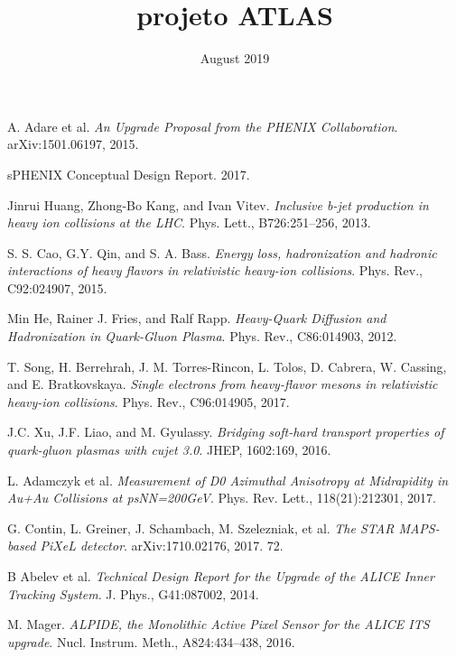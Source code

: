 \documentclass{report}
\title{projeto ATLAS}
\date{August 2019}
\begin{document}

%



\tableofcontents








%


\begin{thebibliography}{9}

A. Adare et al. \textit{An Upgrade Proposal from the PHENIX Collaboration}. arXiv:1501.06197, 2015.

 sPHENIX Conceptual Design Report. 2017.

 Jinrui Huang, Zhong-Bo Kang, and Ivan Vitev. \textit{Inclusive b-jet production in heavy ion collisions at the LHC}. Phys. Lett., B726:251–256, 2013.

 S. S. Cao, G.Y. Qin, and S. A. Bass. \textit{Energy loss, hadronization and hadronic interactions of heavy flavors in relativistic heavy-ion collisions}. Phys. Rev., C92:024907, 2015.

 Min He, Rainer J. Fries, and Ralf Rapp. \textit{Heavy-Quark Diffusion and Hadronization in Quark-Gluon Plasma}. Phys. Rev., C86:014903, 2012.

 T. Song, H. Berrehrah, J. M. Torres-Rincon, L. Tolos, D. Cabrera, W. Cassing, and E. Bratkovskaya. \textit{Single electrons from heavy-flavor mesons in relativistic heavy-ion collisions}. Phys. Rev., C96:014905, 2017.

 J.C. Xu, J.F. Liao, and M. Gyulassy. \textit{Bridging soft-hard transport properties of quark-gluon plasmas with cujet 3.0}. JHEP, 1602:169, 2016.

  L. Adamczyk et al. \textit{Measurement of D0 Azimuthal Anisotropy at Midrapidity in Au+Au Collisions at psNN=200GeV}. Phys. Rev. Lett., 118(21):212301, 2017.

 G. Contin, L. Greiner, J. Schambach, M. Szelezniak, et al. \textit{The STAR MAPS-based PiXeL detector}. arXiv:1710.02176, 2017. 72.

 B Abelev et al. \textit{Technical Design Report for the Upgrade of the ALICE Inner Tracking System}. J. Phys., G41:087002, 2014.

 M. Mager. \textit{ALPIDE, the Monolithic Active Pixel Sensor for the ALICE ITS upgrade}. Nucl. Instrum. Meth., A824:434–438, 2016.


\end{thebibliography}
\end{document}
